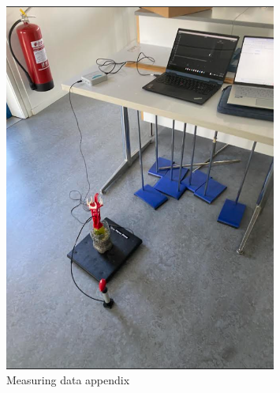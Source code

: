 \documentclass[12pt,a4paper]{article}
\begin{document}
\begin{figure}[H]
\centering
\includegraphics[width=0.8\textwidth]{measuring data appendix.png}
\caption{Measuring data appendix}
\label{fig:data_appendix}
\end{figure}
\end{document}
